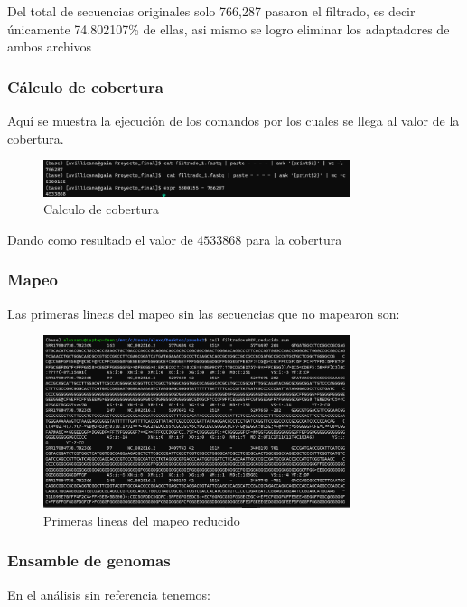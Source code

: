 \documentclass[journal, letterpaper, 11pt]{IEEEtran}
\begin{document}
Del total de secuencias originales solo 766,287 pasaron el filtrado, es decir únicamente 74.802107\% de ellas, asi mismo se logro eliminar los adaptadores de ambos archivos

\subsubsection{Cálculo de cobertura}
Aquí se muestra la ejecución de los comandos por los cuales se llega al valor de la cobertura.
\begin{figure}[H]
\centering
\includegraphics[width=9cm]{imagenes/cobertura.png}
\caption{Calculo de cobertura}
\end{figure}
Dando como resultado el valor de $4533868$ para la cobertura \linebreak

\subsubsection{Mapeo}
Las primeras lineas del mapeo sin las secuencias que no mapearon son:

\begin{figure}[H]
\centering
\includegraphics[width=9cm]{imagenes/mapeoreducido.png}
\caption{Primeras lineas del mapeo reducido}
\end{figure}


\subsubsection{Ensamble de genomas}
En el análisis sin referencia tenemos:
\end{document}

